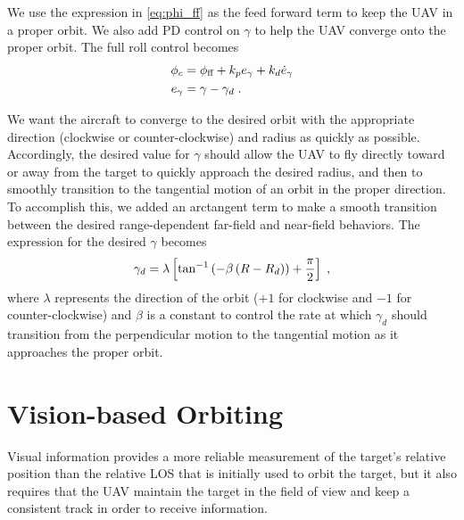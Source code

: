 We use the expression in \eqref{eq:phi_ff} as the feed forward term to keep the UAV in a proper orbit.
We also add PD control on $\gamma$ to help the UAV converge onto the proper orbit.
The full roll control becomes
\begin{align}
  \phi_{c} &= {\phi}_\text{ff}+k_{p}e_{\gamma}+k_{d}\dot{e}_{\gamma}\\
  e_{\gamma} &= \gamma-\gamma_{d}\;.
\end{align}

We want the aircraft to converge to the desired orbit with the appropriate direction (clockwise or counter-clockwise) and radius as quickly as possible. Accordingly, the desired value for $\gamma$ should allow the UAV to fly directly toward or away from the target to quickly approach the desired radius, and then to smoothly transition to the tangential motion of an orbit in the proper direction. To accomplish this, we added an arctangent term to make a smooth transition between the desired range-dependent far-field and near-field behaviors. The expression for the desired $\gamma$ becomes
\begin{equation}
    \gamma_{d} = \lambda\left[\tan^{-1}\left(-\beta\left(R-R_{d}\right)\right)+\frac{\pi}{2}\right]\;,
\end{equation}
where $\lambda$ represents the direction of the orbit ($+1$ for clockwise and $-1$ for counter-clockwise) and $\beta$ is a constant to control the rate at which $\gamma_d$ should transition from the perpendicular motion to the tangential motion as it approaches the proper orbit.

\section{Vision-based Orbiting}
 Visual information provides a more reliable measurement of the target's relative position than the relative LOS that is initially used to orbit the target, but it also requires that the UAV maintain the target in the field of view and keep a consistent track in order to receive information.

